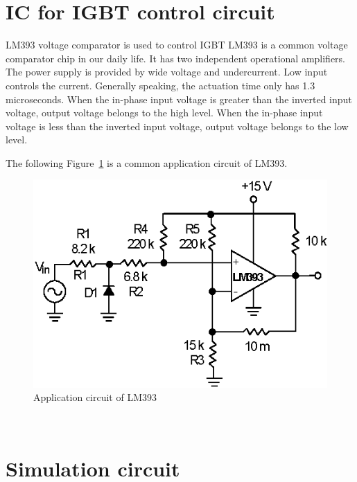\section{IC for IGBT control circuit}
\label{sec:IC for IGBT control circuit}
LM393 voltage comparator is used to control IGBT 
LM393 is a common voltage comparator chip in our daily life. It has two independent operational amplifiers. The power supply is provided by wide voltage and undercurrent. Low input controls the current. Generally speaking, the actuation time only has 1.3 microseconds. When the in-phase input voltage is greater than the inverted input voltage, output voltage belongs to the high level. When the in-phase input voltage is less than the inverted input voltage, output voltage belongs to the low level. 

The following Figure~\ref{fig:3.2} is a common application circuit of LM393.

\begin{figure}[!ht]
	\centering
	\includegraphics[width=13cm]{grafiken/3.2.eps}
	\caption{Application circuit of LM393} 
	\label{fig:3.2}
\end{figure}
\FloatBarrier
\\
\section{Simulation circuit}
\label{sec:Simulation circuit}

